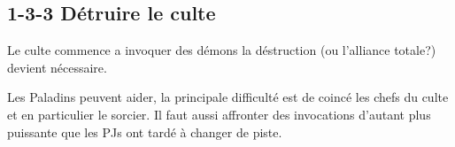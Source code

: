 \subsection*{1-3-3 Détruire le culte}

Le culte commence a invoquer des démons la déstruction (ou l'alliance totale?) devient nécessaire.

Les Paladins peuvent aider, la principale difficulté est de coincé les chefs du culte et en particulier
le sorcier. Il faut aussi affronter des invocations d'autant plus puissante que les PJs ont tardé à changer
de piste. 




